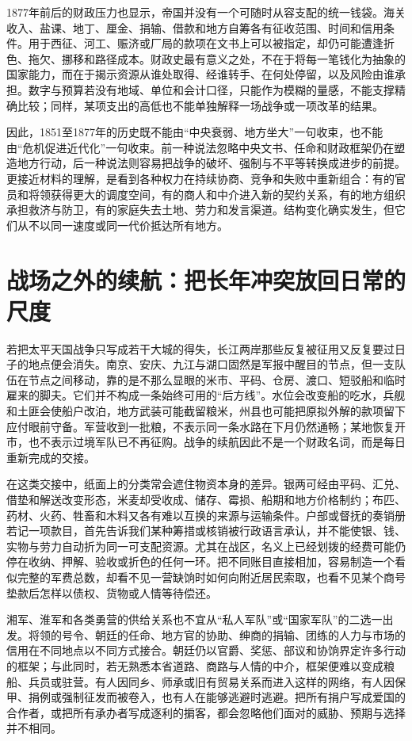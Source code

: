 1877年前后的财政压力也显示，帝国并没有一个可随时从容支配的统一钱袋。海关收入、盐课、地丁、厘金、捐输、借款和地方自筹各有征收范围、时间和信用条件。用于西征、河工、赈济或厂局的款项在文书上可以被指定，却仍可能遭逢折色、拖欠、挪移和路径成本。财政史最有意义之处，不在于将每一笔钱化为抽象的国家能力，而在于揭示资源从谁处取得、经谁转手、在何处停留，以及风险由谁承担。数字与预算若没有地域、单位和会计口径，只能作为模糊的量感，不能支撑精确比较；同样，某项支出的高低也不能单独解释一场战争或一项改革的结果。

因此，1851至1877年的历史既不能由“中央衰弱、地方坐大”一句收束，也不能由“危机促进近代化”一句收束。前一种说法忽略中央文书、任命和财政框架仍在塑造地方行动，后一种说法则容易把战争的破坏、强制与不平等转换成进步的前提。更接近材料的理解，是看到各种权力在持续协商、竞争和失败中重新组合：有的官员和将领获得更大的调度空间，有的商人和中介进入新的契约关系，有的地方组织承担救济与防卫，有的家庭失去土地、劳力和发言渠道。结构变化确实发生，但它们从不以同一速度或同一代价抵达所有地方。

\section{战场之外的续航：把长年冲突放回日常的尺度}

若把太平天国战争只写成若干大城的得失，长江两岸那些反复被征用又反复要过日子的地点便会消失。南京、安庆、九江与湖口固然是军报中醒目的节点，但一支队伍在节点之间移动，靠的是不那么显眼的米市、平码、仓房、渡口、短驳船和临时雇来的脚夫。它们并不构成一条始终可用的“后方线”。水位会改变船的吃水，兵舰和土匪会使船户改泊，地方武装可能截留粮米，州县也可能把原拟外解的款项留下应付眼前守备。军营收到一批粮，不表示同一条水路在下月仍然通畅；某地恢复开市，也不表示过境军队已不再征购。战争的续航因此不是一个财政名词，而是每日重新完成的交接。

在这类交接中，纸面上的分类常会遮住物资本身的差异。银两可经由平码、汇兑、借垫和解送改变形态，米麦却受收成、储存、霉损、船期和地方价格制约；布匹、药材、火药、牲畜和木料又各有难以互换的来源与运输条件。户部或督抚的奏销册若记一项款目，首先告诉我们某种筹措或核销被行政语言承认，并不能使银、钱、实物与劳力自动折为同一可支配资源。尤其在战区，名义上已经划拨的经费可能仍停在收纳、押解、验收或折色的任何一环。把不同账目直接相加，容易制造一个看似完整的军费总数，却看不见一营缺饷时如何向附近居民索取，也看不见某个商号垫款后怎样以债权、货物或人情等待偿还。

湘军、淮军和各类勇营的供给关系也不宜从“私人军队”或“国家军队”的二选一出发。将领的号令、朝廷的任命、地方官的协助、绅商的捐输、团练的人力与市场的信用在不同地点以不同方式接合。朝廷仍以官爵、奖惩、部议和协饷界定许多行动的框架；与此同时，若无熟悉本省道路、商路与人情的中介，框架便难以变成粮船、兵员或驻营。有人因同乡、师承或旧有贸易关系而进入这样的网络，有人因保甲、捐例或强制征发而被卷入，也有人在能够逃避时逃避。把所有捐户写成爱国的合作者，或把所有承办者写成逐利的掮客，都会忽略他们面对的威胁、预期与选择并不相同。

